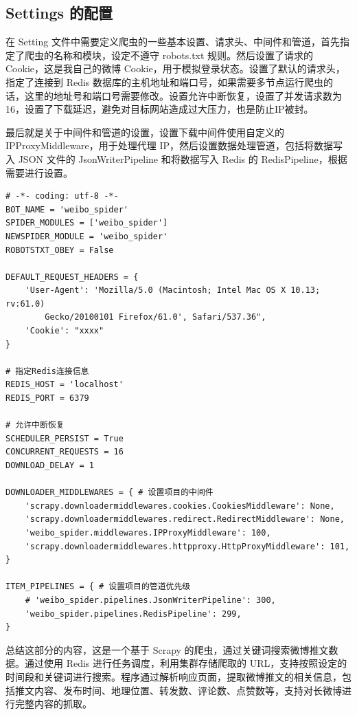 \documentclass[12pt,hyperref,a4paper,UTF8]{ctexart}
\begin{document}
\subsection{Settings 的配置}

在 Setting 文件中需要定义爬虫的一些基本设置、请求头、中间件和管道，首先指定了爬虫的名称和模块，设定不遵守 robots.txt 规则。然后设置了请求的 Cookie，这是我自己的微博 Cookie，用于模拟登录状态。设置了默认的请求头，指定了连接到 Redis 数据库的主机地址和端口号，如果需要多节点运行爬虫的话，这里的地址号和端口号需要修改。设置允许中断恢复，设置了并发请求数为16，设置了下载延迟，避免对目标网站造成过大压力，也是防止IP被封。

最后就是关于中间件和管道的设置，设置下载中间件使用自定义的 IPProxyMiddleware，用于处理代理 IP，然后设置数据处理管道，包括将数据写入 JSON 文件的 JsonWriterPipeline 和将数据写入 Redis 的 RedisPipeline，根据需要进行设置。

\begin{verbatim} 
# -*- coding: utf-8 -*-
BOT_NAME = 'weibo_spider'
SPIDER_MODULES = ['weibo_spider']
NEWSPIDER_MODULE = 'weibo_spider'
ROBOTSTXT_OBEY = False

DEFAULT_REQUEST_HEADERS = {
    'User-Agent': 'Mozilla/5.0 (Macintosh; Intel Mac OS X 10.13; rv:61.0) 
        Gecko/20100101 Firefox/61.0', Safari/537.36",
    'Cookie': "xxxx"
}

# 指定Redis连接信息
REDIS_HOST = 'localhost'
REDIS_PORT = 6379

# 允许中断恢复
SCHEDULER_PERSIST = True
CONCURRENT_REQUESTS = 16
DOWNLOAD_DELAY = 1

DOWNLOADER_MIDDLEWARES = { # 设置项目的中间件
    'scrapy.downloadermiddlewares.cookies.CookiesMiddleware': None,
    'scrapy.downloadermiddlewares.redirect.RedirectMiddleware': None,
    'weibo_spider.middlewares.IPProxyMiddleware': 100,
    'scrapy.downloadermiddlewares.httpproxy.HttpProxyMiddleware': 101,
}

ITEM_PIPELINES = { # 设置项目的管道优先级
    # 'weibo_spider.pipelines.JsonWriterPipeline': 300,
    'weibo_spider.pipelines.RedisPipeline': 299,
}
\end{verbatim}   

总结这部分的内容，这是一个基于 Scrapy 的爬虫，通过关键词搜索微博推文数据。通过使用 Redis 进行任务调度，利用集群存储爬取的 URL，支持按照设定的时间段和关键词进行搜索。程序通过解析响应页面，提取微博推文的相关信息，包括推文内容、发布时间、地理位置、转发数、评论数、点赞数等，支持对长微博进行完整内容的抓取。
\end{document}
